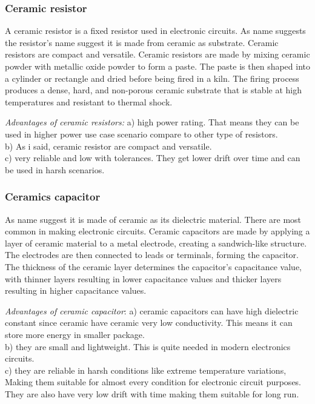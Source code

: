 \documentclass[14pt,a4paper]{extarticle}
\begin{document}
\subsubsection{Ceramic resistor}
\label{sec:org44edd5c}

A ceramic resistor is a fixed resistor used in electronic circuits. As name suggests the resistor's name suggest it is made from ceramic as substrate. Ceramic resistors are compact and versatile. Ceramic resistors are made by mixing ceramic powder with metallic oxide powder to form a paste. The paste is then shaped into a cylinder or rectangle and dried before being fired in a kiln. The firing process produces a dense, hard, and non-porous ceramic substrate that is stable at high temperatures and resistant to thermal shock.

\emph{Advantages of ceramic resistors:} a) high power rating. That means they can be used in higher power use case scenario compare to other type of resistors. \\
b) As i said, ceramic resistor are compact and versatile. \\
c) very reliable and low with tolerances. They get lower drift over time and can be used in harsh scenarios.\\
\subsubsection{Ceramics capacitor}
\label{sec:org22e8ea4}

As name suggest it is made of ceramic as its dielectric material. There are most common in making electronic circuits. Ceramic capacitors are made by applying a layer of ceramic material to a metal electrode, creating a sandwich-like structure. The electrodes are then connected to leads or terminals, forming the capacitor. The thickness of the ceramic layer determines the capacitor's capacitance value, with thinner layers resulting in lower capacitance values and thicker layers resulting in higher capacitance values.

\emph{Advantages of ceramic capacitor}: a) ceramic capacitors can have high dielectric constant since ceramic have ceramic very low conductivity. This means it can store more energy in smaller package.\\
b) they are small and lightweight. This is quite needed in modern electronics circuits.\\
c) they are reliable in harsh conditions like extreme temperature variations, Making them suitable for almost every condition for electronic circuit purposes. They are also have very low drift with time making them suitable for long run.
\end{document}
